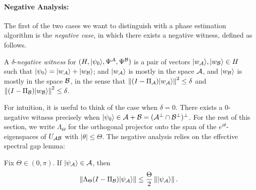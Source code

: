 \documentclass{theoretics}
\def\ket#1{{\lvert}#1\rangle}
\renewcommand{\>}{\rangle}
\newcommand{\<}{\langle}
\renewcommand{\(}{\left(}
\renewcommand{\)}{\right)}
\def\norm#1{\left\| #1 \right\|}
\begin{document}
\paragraph{Negative Analysis:}
The first of the two cases we want to distinguish with a phase estimation algorithm is the \emph{negative case}, in which there exists a negative witness, defined as follows.

\begin{definition}\label{def:neg-witness}
A $\delta$-\emph{negative witness} for $(H,\ket{\psi_0},\Psi^{\cal A},\Psi^{\cal B})$ is a pair of vectors $\ket{w_{\cal A}},\ket{w_{\cal B}}\in H$ such that $\ket{\psi_0}=\ket{w_{\cal A}}+\ket{w_{\cal B}}$; and $\ket{w_{\cal A}}$ is mostly in the space $\cal A$, and $\ket{w_{\cal B}}$ is mostly in the space $\cal B$, in the sense that $\norm{(I-\Pi_{\cal A})\ket{w_{\cal A}}}^2\leq \delta$ and $\norm{(I-\Pi_{\cal B})\ket{w_{\cal B}}}^2\leq \delta$. 
\end{definition}


For intuition, it is useful to think of the case when $\delta=0$. There exists a 0-negative witness precisely when $\ket{\psi_0}\in {\cal A}+{\cal B} = ({\cal A}^\bot\cap {\cal B}^\bot)^\bot$. For the rest of this section, we write  $\Lambda_\Theta$ for the orthogonal projector onto the span of the $e^{i\theta}$-eigenspaces of $U_{\cal AB}$ with $|\theta|\leq \Theta$. The negative analysis relies on the effective spectral gap lemma:
\begin{lemma}\label{lem:effective-spectral-gap}
Fix $\Theta\in (0,\pi)$. If $\ket{\psi_{\cal A}}\in {\cal A}$, then 
$$\norm{\Lambda_\Theta(I-\Pi_{\cal B})\ket{\psi_{\cal A}}} \leq \frac{\Theta}{2}\norm{\ket{\psi_{\cal A}}}.$$
\end{lemma}
\end{document}
